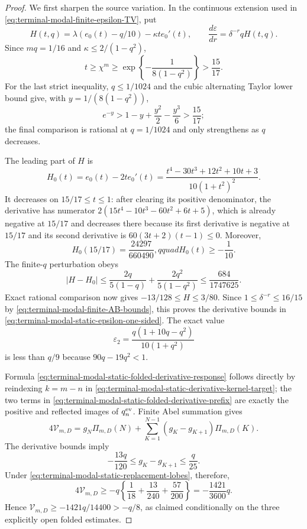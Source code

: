 \begin{proof}
We first sharpen the source variation.  In the continuous extension used in
\eqref{eq:terminal-modal-finite-epsilon-TV}, put
\[
 H(t,q)=\lambda(e_0(t)-q/10)-\kappa t e_0'(t),
 \qquad
 \frac{d\varepsilon}{dr}=\delta^{-r}qH(t,q).
\]
Since $mq=1/16$ and
$\kappa\le2/(1-q^2)$,
\[
 t\ge\chi^m\ge
 \exp\left\{-\frac1{8(1-q^2)}\right\}>\frac{15}{17}.
\]
For the last strict inequality, $q\le1/1024$ and the cubic alternating
Taylor lower bound give, with $y=1/(8(1-q^2))$,
\[
 e^{-y}>1-y+\frac{y^2}{2}-\frac{y^3}{6}>\frac{15}{17};
\]
the final comparison is rational at $q=1/1024$ and only strengthens as $q$
decreases.

The leading part of $H$ is
\[
 H_0(t)=e_0(t)-2te_0'(t)
 =\frac{t^4-30t^3+12t^2+10t+3}{10(1+t^2)^2}.
\]
It decreases on $15/17\le t\le1$: after clearing its positive denominator,
the derivative has numerator
$2(15t^4-10t^3-60t^2+6t+5)$, which is already negative at $15/17$ and
decreases there because its first derivative is negative at $15/17$ and its
second derivative is $60(3t+2)(t-1)\le0$.  Moreover,
\[
 H_0(15/17)=\frac{24297}{660490},qquad H_0(t)\ge-\frac1{10}.
\]
The finite-$q$ perturbation obeys
\[
 |H-H_0|\le
 \frac{2q}{5(1-q)}+\frac{2q^2}{5(1-q^2)}
 \le\frac{684}{1747625}.
\]
Exact rational comparison now gives
$-13/128\le H\le3/80$.  Since
$1\le\delta^{-r}\le16/15$ by
\eqref{eq:terminal-modal-finite-AB-bounds}, this proves the derivative bounds in
\eqref{eq:terminal-modal-static-epsilon-one-sided}.  The exact value
\[
 \varepsilon_2=\frac{q(1+10q-q^2)}{10(1+q^2)}
\]
is less than $q/9$ because $90q-19q^2<1$.

Formula \eqref{eq:terminal-modal-static-folded-derivative-response} follows
directly by reindexing $k=m-n$ in
\eqref{eq:terminal-modal-static-derivative-kernel-target}; the two terms in
\eqref{eq:terminal-modal-static-folded-derivative-prefix} are exactly the
positive and reflected images of $q_n^{\rm ev}$.  Finite Abel summation gives
\[
 4\mathcal V_{m,D}
 =g_N\Pi_{m,D}(N)
 +\sum_{K=1}^{N-1}(g_K-g_{K+1})\Pi_{m,D}(K).
\]
The derivative bounds imply
\[
 -\frac{13q}{120}\le g_K-g_{K+1}\le\frac q{25}.
\]
Under \eqref{eq:terminal-modal-static-replacement-lobes}, therefore,
\[
 4\mathcal V_{m,D}
 \ge-q\left\{\frac1{18}+\frac{13}{240}+\frac{57}{200}\right\}
 =-\frac{1421}{3600}q.
\]
Hence
$\mathcal V_{m,D}\ge-1421q/14400>-q/8$, as claimed conditionally on the
three explicitly open folded estimates.
\end{proof}

